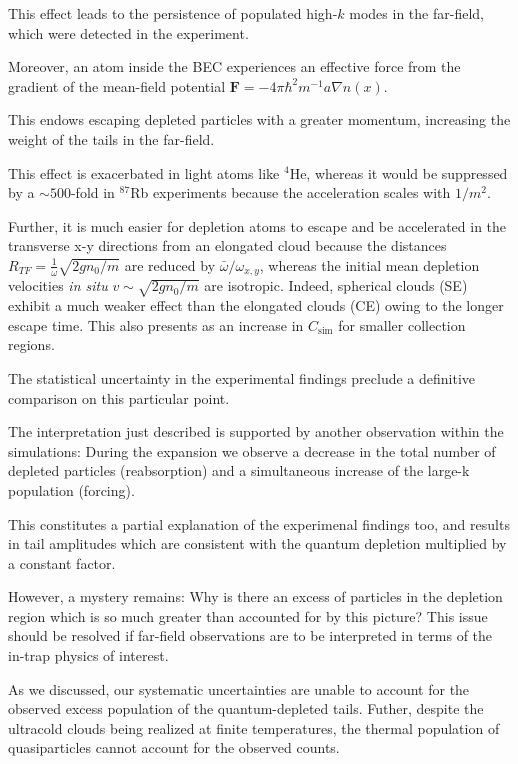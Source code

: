 	This effect leads to the persistence of populated high-$k$ modes in the far-field, which were detected in the experiment.

	Moreover, an atom inside the BEC experiences an effective force from the gradient of the mean-field potential $\textbf{F} = -4\pi\hbar^2 m^{-1}a \nabla  n(x)$.
	
	This endows escaping depleted particles with a greater momentum, increasing the weight of the tails in the far-field.
	
	This effect is exacerbated in light atoms like $^{4}$He, whereas it would be suppressed by a $\sim500$-fold in $^{87}$Rb experiments \cite{Makotyn14} because the acceleration scales with $1/m^2$.
	
	Further, it is much easier for depletion atoms to escape and be accelerated in the transverse x-y directions from an elongated cloud because the distances $R_{TF}=\frac{1}{\omega}\sqrt{2gn_0/m}$ are reduced by $\bar{\omega}/\omega_{x,y}$, whereas the initial mean depletion velocities \textit{in situ} $v\sim \sqrt{2gn_0/m}$ are isotropic.
	Indeed, spherical clouds (SE) exhibit a much weaker effect than the elongated clouds (CE) owing to the longer escape time.
	This also presents as an increase in $C_\textrm{sim}$ for smaller collection regions.
	
	The statistical uncertainty in the experimental findings preclude a definitive comparison on this particular point.

	The interpretation just described is supported by another observation within the simulations:
	During the expansion we observe a decrease in the total number of depleted particles (reabsorption) and a simultaneous increase of the large-k population (forcing).
	
	This constitutes a partial explanation of the experimenal findings too, and results in tail amplitudes which are consistent with the quantum depletion multiplied by a constant factor.
	
	However, a mystery remains: Why is there an excess of particles in the depletion region which is so much greater than accounted for by this picture? 
	This issue should be resolved if far-field observations are to be interpreted in terms of the in-trap physics of interest.
	
	
	As we discussed, our systematic uncertainties are unable to account for the observed excess population of the quantum-depleted tails.
	Futher, despite the ultracold clouds being realized at finite temperatures, the thermal population of quasiparticles cannot account for the observed counts.
	
